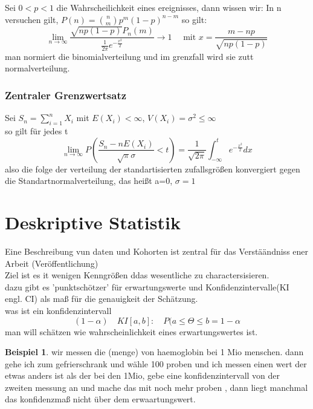 \documentclass[a4paper]{article}
\theoremstyle{definition}
\newtheorem{beispiel}{Beispiel}%
\theoremstyle{remark}
\begin{document}
Sei $0<p<1$ die Wahrscheilichkeit eines ereignisses, dann wissen wir: In n versuchen gilt, $P(n)= \binom{n}{m}p^m(1-p)^{n-m}$ so gilt:\\
\begin{equation}
\lim_{n\rightarrow \infty} \frac{\sqrt{np(1-p)}P_n(m)}{\frac{1}{2\pi}e^{-\frac{x^2}{2}}}\rightarrow 1 \quad \textrm{ mit  }x= \frac{m-np}{\sqrt{np(1-p)}}
\end{equation}
man normiert die binomialverteilung und im grenzfall wird sie zutt normalverteilung.
\subsubsection{Zentraler Grenzwertsatz}
\label{ssub:zentraler_grenzwertsatz}

Sei $ S_n =\sum_{i=1}^{n}X_i$ mit $ E(X_i)< \infty$, $V(X_i)=\sigma ^2 \leq \infty$\\
so gilt für jedes t 
\begin{equation}
  \lim_{n\rightarrow \infty}P(\frac{S_n-nE(X_i)}{\sqrt{\pi}\sigma }<t)= \frac{1}{\sqrt{2\pi}}\int_{-\infty}^t e^{-\frac{x^2}{2}}dx
\end{equation}
also die folge der verteilung der standartisierten zufallsgrößen konvergiert gegen die Standartnormalverteilung, das heißt a=0, $\sigma =1$ 

\section{Deskriptive Statistik}
\label{sec:deskriptive_statistik}
Eine Beschreibung vun daten und Kohorten ist zentral für das Verstäändniss ener Arbeit (Veröffentlichung)\\
Ziel ist es it wenigen Kenngrößen ddas wesentliche zu charactersisieren.\\
dazu gibt es 'punktschötzer' für erwartungswerte und Konfidenzintervalle(KI engl. CI) als maß für die genauigkeit der Schätzung.\\
was ist ein konfidenzintervall\:
\begin{equation}
  (1-\alpha )\quad KI[a,b]: \quad P(a\leq\Theta\leq b = 1-\alpha 
\end{equation}
man will schätzen wie wahrscheinlichkeit eines erwartungswertes ist.
\begin{beispiel}
  wir messen die (menge) von haemoglobin bei 1 Mio menschen. dann gehe ich zum gefrierschrank und wähle 100 proben und ich messen einen wert der etwas anders ist als der bei den 1Mio, gebe eine konfidenzintervall von der zweiten messung an und mache das mit noch mehr proben , dann liegt manchmal das konfidenzmaß nicht über dem erwaartungswert.
\end{beispiel}
\end{document}
